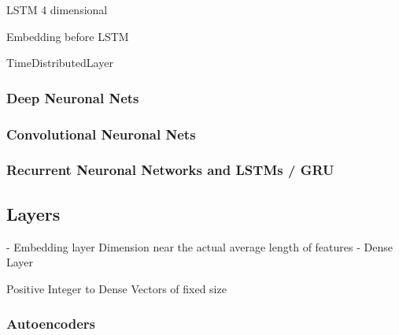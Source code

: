 LSTM 4 dimensional

Embedding before LSTM

TimeDistributedLayer
\subsubsection{Deep Neuronal Nets}

\subsubsection{Convolutional Neuronal Nets}
\subsubsection{Recurrent Neuronal Networks and LSTMs / GRU}

\subsection{Layers}

- Embedding layer
    Dimension near the actual average length of features
- Dense Layer

Positive Integer to Dense Vectors of fixed size

\subsubsection{Autoencoders}
